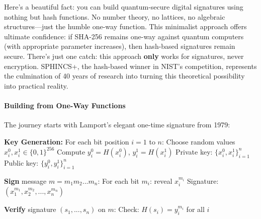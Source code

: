 \documentclass[11pt,a4paper]{article}
\begin{document}
Here's a beautiful fact: you can build quantum-secure digital signatures using nothing but hash functions. No number theory, no lattices, no algebraic structures—just the humble one-way function. This minimalist approach offers ultimate confidence: if SHA-256 remains one-way against quantum computers (with appropriate parameter increases), then hash-based signatures remain secure. There's just one catch: this approach \textbf{only} works for signatures, never encryption. SPHINCS+, the hash-based winner in NIST's competition, represents the culmination of 40 years of research into turning this theoretical possibility into practical reality.

\paragraph{Building from One-Way Functions}

The journey starts with Lamport's elegant one-time signature from 1979:

\begin{algorithm}
\caption{Lamport One-Time Signature (Simplified)}
\begin{algorithmic}[1]
\State \textbf{Key Generation:}
\State \quad For each bit position $i = 1$ to $n$:
\State \quad \quad Choose random values $x_i^0, x_i^1 \in \{0,1\}^{256}$
\State \quad \quad Compute $y_i^0 = H(x_i^0)$, $y_i^1 = H(x_i^1)$
\State \quad Private key: $\{x_i^0, x_i^1\}_{i=1}^n$
\State \quad Public key: $\{y_i^0, y_i^1\}_{i=1}^n$

\State \textbf{Sign} message $m = m_1 m_2 ... m_n$:
\State \quad For each bit $m_i$: reveal $x_i^{m_i}$
\State \quad Signature: $(x_1^{m_1}, x_2^{m_2}, ..., x_n^{m_n})$

\State \textbf{Verify} signature $(s_1, ..., s_n)$ on $m$:
\State \quad Check: $H(s_i) = y_i^{m_i}$ for all $i$
\end{algorithmic}
\end{algorithm}
\end{document}
